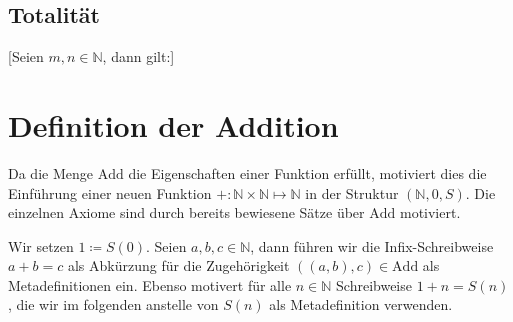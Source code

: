 \documentclass[main.tex]{subfiles}
\begin{document}
\subsection{Totalität}

%
[Seien \(m,n\in\mathbb{N}\), dann gilt:]
\begin{tabproof}


      {}



\end{tabproof}


\section{Definition der Addition}

\begin{definition}
Da die Menge \(\mathrm{Add}\) die Eigenschaften einer Funktion erfüllt, motiviert dies die Einführung einer neuen Funktion \(+:\mathbb{N}\times\mathbb{N}\mapsto \mathbb{N}\) in der Struktur
\((\mathbb{N},0,S)\). Die einzelnen Axiome sind durch bereits bewiesene Sätze
über \(\mathrm{Add}\) motiviert.
\end{definition}
\begin{remark}
Wir setzen \(1 \coloneqq S(0)\). Seien \(a,b,c\in\mathbb{N}\), dann  führen wir die Infix-Schreibweise \(a+b=c\) als Abkürzung für die Zugehörigkeit \(((a,b),c)\in \mathrm{Add}\) als Metadefinitionen ein. Ebenso motivert  für alle \(n\in\mathbb{N}\) Schreibweise \(1+n=S(n)\), die wir im folgenden anstelle von \(S(n)\) als Metadefinition verwenden.
\end{remark}
\end{document}
